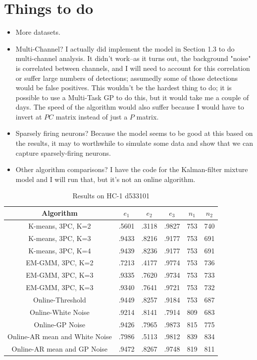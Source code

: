 \documentclass{article} %
\begin{document}
\section{Things to do}
\begin{itemize}
\item More datasets.
\item Multi-Channel?  I actually did implement the model in Section 1.3 to do multi-channel analysis.  It didn't work--as it turns out, the background "noise" is correlated between channels, and I will need to account for this correlation or suffer large numbers of detections; assumedly some of those detections would be false positives.  This wouldn't be the hardest thing to do; it is possible to use a Multi-Task GP to do this, but it would take me a couple of days.  The speed of the algorithm would also suffer because I would have to invert at $PC$ matrix instead of just a $P$ matrix.
\item Sparsely firing neurons?  Because the model seems to be good at this based on the results, it may to worthwhile to simulate some data and show that we can capture sparsely-firing neurons.
\item Other algorithm comparisons?  I have the code for the Kalman-filter mixture model and I will run that, but it's not an online algorithm.
\end{itemize}
\begin{center}
\begin{table}
\begin{tabular}[h]{|c||c|c|c|c|c|}
\hline
Algorithm & $e_1$ & $e_2$ & $e_3$ & $n_1$ & $n_2$\\
\hline K-means, 3PC, K=2 & .5601 & .3118 & .9827 & 753 & 740\\
\hline K-means, 3PC, K=3 & .9433 & .8216 & .9177 & 753 & 691\\
\hline K-means, 3PC, K=4 & .9439 & .8236 & .9177 & 753 & 691\\
\hline EM-GMM, 3PC, K=2 & .7213 & .4177 & .9774 & 753 & 736\\
\hline EM-GMM, 3PC, K=3 & .9335 & .7620 & .9734 & 753 & 733\\
\hline EM-GMM, 3PC, K=3 & .9340 & .7641 & .9721 & 753 & 732\\
\hline Online-Threshold & .9449 & .8257 & .9184 & 753 & 687\\
\hline Online-White Noise & .9214 & .8141 & .7914 & 809 & 683\\
\hline Online-GP Noise & .9426 & .7965 & .9873 & 815 & 775\\
\hline Online-AR mean and White Noise & .7986 & .5113 & .9812 & 839 & 834\\
\hline Online-AR mean and GP Noise & .9472 & .8267 & .9748 & 819 & 811\\
\hline
\end{tabular}
\caption{Results on HC-1 d533101}
\end{table}
\end{center}
\end{document}
